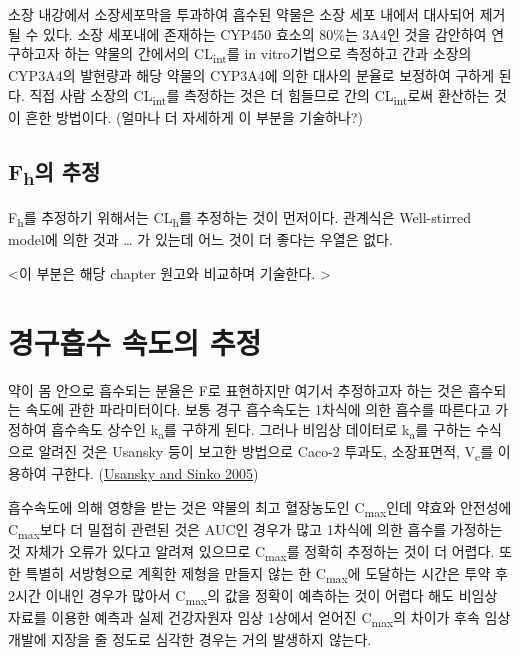 \documentclass[
  11pt,
  krantz2, a4paper, twoside]{krantz}
\begin{document}
소장 내강에서 소장세포막을 투과하여 흡수된 약물은 소장 세포 내에서 대사되어 제거될 수 있다.
소장 세포내에 존재하는 CYP450 효소의 80\%는 3A4인 것을 감안하여 연구하고자 하는 약물의 간에서의 CL\textsubscript{int}를 in vitro기법으로 측정하고 간과 소장의 CYP3A4의 발현량과 해당 약물의 CYP3A4에 의한 대사의 분율로 보정하여 구하게 된다.
직접 사람 소장의 CL\textsubscript{int}를 측정하는 것은 더 힘들므로 간의 CL\textsubscript{int}로써 환산하는 것이 흔한 방법이다. (얼마나 더 자세하게 이 부분을 기술하나?)

\hypertarget{fhuxc758-uxcd94uxc815}{%
\subsection{\texorpdfstring{F\textsubscript{h}의 추정}{Fh의 추정}}\label{fhuxc758-uxcd94uxc815}}

F\textsubscript{h}를 추정하기 위해서는 CL\textsubscript{h}를 추정하는 것이 먼저이다. 관계식은 Well-stirred model에 의한 것과 \ldots{} 가 있는데 어느 것이 더 좋다는 우열은 없다.

\textless 이 부분은 해당 chapter 원고와 비교하며 기술한다. \textgreater{}

\hypertarget{uxacbduxad6cuxd761uxc218-uxc18duxb3c4uxc758-uxcd94uxc815}{%
\section{경구흡수 속도의 추정}\label{uxacbduxad6cuxd761uxc218-uxc18duxb3c4uxc758-uxcd94uxc815}}

약이 몸 안으로 흡수되는 분율은 F로 표현하지만 여기서 추정하고자 하는 것은 흡수되는 속도에 관한 파라미터이다. 보통 경구 흡수속도는 1차식에 의한 흡수를 따른다고 가정하여 흡수속도 상수인 k\textsubscript{a}를 구하게 된다.
그러나 비임상 데이터로 k\textsubscript{a}를 구하는 수식으로 알려진 것은 Usansky 등이 보고한 방법으로 Caco-2 투과도, 소장표면적, V\textsubscript{c}를 이용하여 구한다. (\protect\hyperlink{ref-usansky2005estimating}{Usansky and Sinko 2005})

흡수속도에 의해 영향을 받는 것은 약물의 최고 혈장농도인 C\textsubscript{max}인데 약효와 안전성에 C\textsubscript{max}보다 더 밀접히 관련된 것은 AUC인 경우가 많고 1차식에 의한 흡수를 가정하는 것 자체가 오류가 있다고 알려져 있으므로 C\textsubscript{max}를 정확히 추정하는 것이 더 어렵다.
또한 특별히 서방형으로 계획한 제형을 만들지 않는 한 C\textsubscript{max}에 도달하는 시간은 투약 후 2시간 이내인 경우가 많아서 C\textsubscript{max}의 값을 정확이 예측하는 것이 어렵다 해도 비임상 자료를 이용한 예측과 실제 건강자원자 임상 1상에서 얻어진 C\textsubscript{max}의 차이가 후속 임상개발에 지장을 줄 정도로 심각한 경우는 거의 발생하지 않는다.
\end{document}
